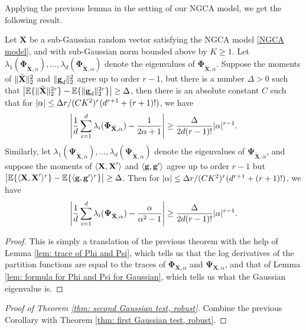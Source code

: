 \documentclass[final,12pt]{colt2018} %
\numberwithin{equation}{section}
\DeclarePairedDelimiter{\abs}{\lvert}{\rvert}
\DeclarePairedDelimiter{\norm}{\lVert}{\rVert}
\DeclarePairedDelimiter{\braces}{\lbrace}{\rbrace}
\DeclarePairedDelimiter{\inprod}{\langle}{\rangle}
\newcommand{\E}{\mathbb{E}}
\newcommand{\boldg}{\textbf{g}}
\newcommand{\boldPhi}{\boldsymbol{\Phi}}
\newcommand{\boldPsi}{\boldsymbol{\Psi}}
\newcommand{\boldX}{\textbf{X}}
\begin{document}
Applying the previous lemma in the setting of our NGCA model, we get the following result.

\begin{theorem} \label{thm:robustness_for_non_Gaussian_eigenvalues}
	Let $\boldX$ be a sub-Gaussian random vector satisfying the NGCA model \eqref{NGCA model}, and with sub-Gaussian norm bounded above by $K \geq 1$. Let $\lambda_1(\boldPhi_{\tilde{\boldX},\alpha}),\ldots,\lambda_d(\boldPhi_{\tilde{\boldX},\alpha})$ denote the eigenvalues of $\boldPhi_{\tilde{\boldX},\alpha}$. Suppose the moments of $\norm{\tilde{\boldX}}_2^2$ and $\norm{\boldg_d}_2^2$ agree up to order $r-1$, but there is a number $\Delta > 0$ such that $\abs*{\E\braces{ \norm{\tilde{\boldX}}_2^{2r}} - \E\braces{ \norm{\boldg_d}_2^{2r}}} \geq \Delta$, then there is an absolute constant $C$ such that for $\abs{\alpha} \leq \Delta r/(CK^2)^r(d^{r+1}+(r+1)!)$, we have
	\begin{align} \label{Phi difference}
	\abs*{\frac{1}{d}\sum_{i=1}^d\lambda_i(\boldPhi_{\tilde{\boldX},\alpha})-\frac{1}{2\alpha+1}} \geq \frac{\Delta}{2d(r-1)!}\abs{\alpha}^{r-1}.
	\end{align}
	Similarly, let $\lambda_1(\boldPsi_{\tilde{\boldX},\alpha}),\ldots,\lambda_d(\boldPsi_{\tilde{\boldX},\alpha})$ denote the eigenvalues of $\boldPsi_{\tilde{\boldX},\alpha}$, and suppose the moments of $\inprod{\boldX,\boldX'}$ and $\inprod{\boldg,\boldg'}$ agree up to order $r-1$ but $\abs*{\E\braces{ \inprod{\boldX,\boldX'}^r} - \E\braces{ \inprod{\boldg,\boldg'}^r}} \geq \Delta$. Then for $\abs{\alpha} \leq \Delta r/(CK^2)^r(d^{r+1}+(r+1)!)$, we have
	\begin{align} \label{Psi difference}
	\abs*{\frac{1}{d}\sum_{i=1}^d\lambda_i(\boldPsi_{\tilde{\boldX},\alpha})-\frac{\alpha}{\alpha^2-1}} \geq \frac{\Delta}{2d(r-1)!}\abs{\alpha}^{r-1}.
	\end{align}
\end{theorem}

\begin{proof}
	This is simply a translation of the previous theorem with the help of Lemma \ref{lem: trace of Phi and Psi}, which tells us that the log derivatives of the partition functions are equal to the traces of $\boldPhi_{\boldX,\alpha}$ and $\boldPsi_{\boldX,\alpha}$, and that of Lemma \ref{lem: formula for Phi and Psi for Gaussian}, which tells us what the Gaussian eigenvalue is.
\end{proof}

\begin{proof}[Proof of Theorem \ref{thm: second Gaussian test, robust}]
	Combine the previous Corollary with Theorem \ref{thm: first Gaussian test, robust}.
\end{proof}
\end{document}
